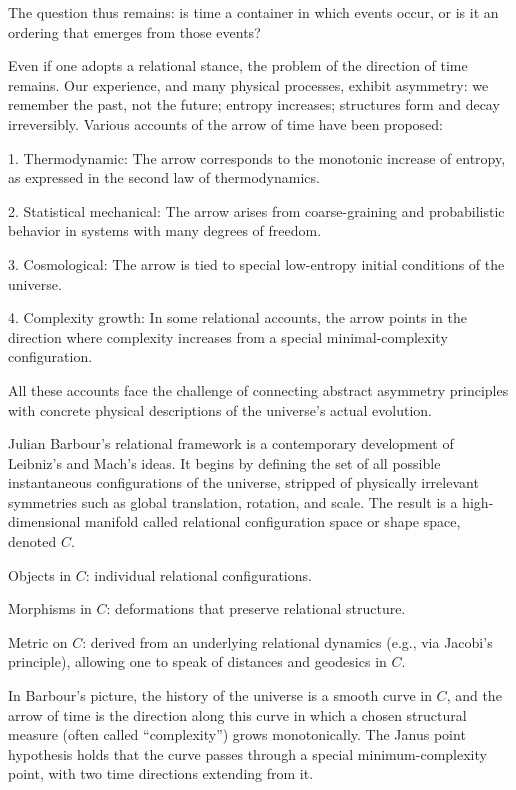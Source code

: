 \documentclass[11pt]{article}
\theoremstyle{plain}
\theoremstyle{definition}
\begin{document}
The question thus remains: is time a container in which events occur, or is it an ordering that emerges from those events?

Even if one adopts a relational stance, the problem of the direction of time remains. Our experience, and many physical processes, exhibit asymmetry: we remember the past, not the future; entropy increases; structures form and decay irreversibly. Various accounts of the arrow of time have been proposed:

1. Thermodynamic: The arrow corresponds to the monotonic increase of entropy, as expressed in the second law of thermodynamics.

2. Statistical mechanical: The arrow arises from coarse-graining and probabilistic behavior in systems with many degrees of freedom.

3. Cosmological: The arrow is tied to special low-entropy initial conditions of the universe.

4. Complexity growth: In some relational accounts, the arrow points in the direction where complexity increases from a special minimal-complexity configuration.

All these accounts face the challenge of connecting abstract asymmetry principles with concrete physical descriptions of the universe’s actual evolution.

Julian Barbour’s relational framework is a contemporary development of Leibniz’s and Mach’s ideas. It begins by defining the set of all possible instantaneous configurations of the universe, stripped of physically irrelevant symmetries such as global translation, rotation, and scale. The result is a high-dimensional manifold called relational configuration space or shape space, denoted $C$.

Objects in $C$: individual relational configurations.

Morphisms in $C$: deformations that preserve relational structure.

Metric on $C$: derived from an underlying relational dynamics (e.g., via Jacobi’s principle), allowing one to speak of distances and geodesics in $C$.

In Barbour’s picture, the history of the universe is a smooth curve in $C$, and the arrow of time is the direction along this curve in which a chosen structural measure (often called “complexity”) grows monotonically. The Janus point hypothesis holds that the curve passes through a special minimum-complexity point, with two time directions extending from it.
\end{document}
